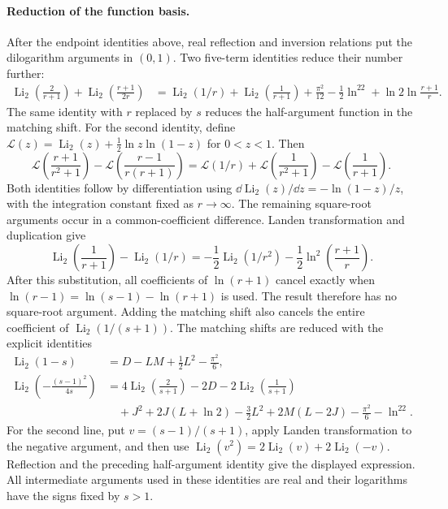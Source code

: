 \paragraph{Reduction of the function basis.} After the endpoint identities above, real reflection and inversion relations put the dilogarithm arguments in $(0,1)$. Two five-term identities reduce their number further:
\begin{align}
 \operatorname{Li}_2\!\left(\frac2{r+1}\right)+\operatorname{Li}_2\!\left(\frac{r+1}{2r}\right)
 &=\operatorname{Li}_2(1/r)+\operatorname{Li}_2\!\left(\frac1{r+1}\right)+\frac{\pi^2}{12}-\frac12\ln^22+\ln2\ln\frac{r+1}{r}.
\end{align}
The same identity with $r$ replaced by $s$ reduces the half-argument function in the matching shift. For the second identity, define $\mathcal L(z)=\operatorname{Li}_2(z)+\tfrac12\ln z\ln(1-z)$ for $0<z<1$. Then
\begin{equation}
 \mathcal L\!\left(\frac{r+1}{r^2+1}\right)-\mathcal L\!\left(\frac{r-1}{r(r+1)}\right)
 =\mathcal L(1/r)+\mathcal L\!\left(\frac1{r^2+1}\right)-\mathcal L\!\left(\frac1{r+1}\right).
\end{equation}
Both identities follow by differentiation using $\dd\operatorname{Li}_2(z)/\dd z=-\ln(1-z)/z$, with the integration constant fixed as $r\to\infty$. The remaining square-root arguments occur in a common-coefficient difference. Landen transformation and duplication give
\begin{equation}
 \operatorname{Li}_2\!\left(\frac1{r+1}\right)-\operatorname{Li}_2(1/r)
 =-\frac12\operatorname{Li}_2(1/r^2)-\frac12\ln^2\!\left(\frac{r+1}{r}\right).
\end{equation}
After this substitution, all coefficients of $\ln(r+1)$ cancel exactly when $\ln(r-1)=\ln(s-1)-\ln(r+1)$ is used. The result therefore has no square-root argument. Adding the matching shift also cancels the entire coefficient of $\operatorname{Li}_2(1/(s+1))$.
The matching shifts are reduced with the explicit identities
\begin{align}
 \operatorname{Li}_2(1-s)&=D-LM+\tfrac12L^2-\frac{\pi^2}{6},\\
 \operatorname{Li}_2\!\left(-\frac{(s-1)^2}{4s}\right)
 &=4\operatorname{Li}_2\!\left(\frac2{s+1}\right)-2D-2\operatorname{Li}_2\!\left(\frac1{s+1}\right)\\
 &\quad+J^2+2J(L+\ln2)-\tfrac32L^2+2M(L-2J)-\frac{\pi^2}{6}-\ln^22.
\end{align}
For the second line, put $v=(s-1)/(s+1)$, apply Landen transformation to the negative argument, and then use $\operatorname{Li}_2(v^2)=2\operatorname{Li}_2(v)+2\operatorname{Li}_2(-v)$. Reflection and the preceding half-argument identity give the displayed expression. All intermediate arguments used in these identities are real and their logarithms have the signs fixed by $s>1$.
